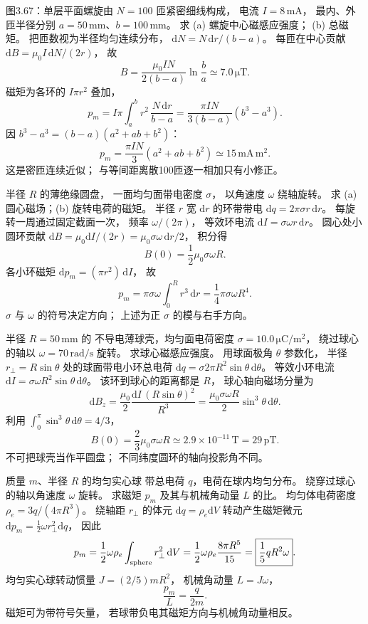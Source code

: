 图3.67：单层平面螺旋由
$N=100$ 匝紧密细线构成，
电流 $I=8\,\mathrm{mA}$，
最内、外匝半径分别
$a=50\,\mathrm{mm}$、$b=100\,\mathrm{mm}$。
求 (a) 螺旋中心磁感应强度；
(b) 总磁矩。
\exsolution
把匝数视为半径均匀连续分布，
$\mathrm dN=N\,\mathrm dr/(b-a)$。
每匝在中心贡献
$\mathrm dB=\mu_0I\,\mathrm dN/(2r)$，
故
\[
\boxed{B=
\frac{\mu_0IN}{2(b-a)}\ln\frac ba
\simeq7.0\,\mathrm{\mu T}}.
\]
磁矩为各环的
$I\pi r^2$ 叠加，
\[
p_m=I\pi\int_a^b r^2\,
\frac{N\,\mathrm dr}{b-a}
=\frac{\pi IN}{3(b-a)}(b^3-a^3).
\]
因 $b^3-a^3=(b-a)(a^2+ab+b^2)$：
\[
\boxed{p_m=
\frac{\pi IN}{3}(a^2+ab+b^2)
\simeq15\,\mathrm{mA\,m^2}}.
\]
\excheck 这是密匝连续近似；
与等间距离散100匝逐一相加只有小修正。

半径 $R$ 的薄绝缘圆盘，
一面均匀面带电密度 $\sigma$，
以角速度 $\omega$ 绕轴旋转。
求 (a) 圆心磁场；(b) 旋转电荷的磁矩。
\exsolution
半径 $r$ 宽 $\mathrm dr$
的环带带电
$\mathrm dq=2\pi\sigma r\,\mathrm dr$。
每旋转一周通过固定截面一次，
频率 $\omega/(2\pi)$，
等效环电流
$\mathrm dI=\sigma\omega r\,\mathrm dr$。
圆心处小圆环贡献
$\mathrm dB=\mu_0\mathrm dI/(2r)
=\mu_0\sigma\omega\,\mathrm dr/2$，
积分得
\[
\boxed{B(0)=\frac12\mu_0\sigma\omega R}.
\]
各小环磁矩
$\mathrm dp_m=(\pi r^2)\,\mathrm dI$，
故
\[
\boxed{p_m=\pi\sigma\omega\int_0^Rr^3\,\mathrm dr
=\frac14\pi\sigma\omega R^4}.
\]
\excheck $\sigma$ 与 $\omega$
的符号决定方向；
上述为正 $\sigma$ 的模与右手方向。

半径 $R=50\,\mathrm{mm}$ 的
不导电薄球壳，均匀面电荷密度
$\sigma=10.0\,\mathrm{\mu C/m^2}$，
绕过球心的轴以
$\omega=70\,\mathrm{rad/s}$ 旋转。
求球心磁感应强度。
\exsolution
用球面极角 $\theta$ 参数化，
半径 $r_\perp=R\sin\theta$
处的球面带电小环总电荷
$\mathrm dq=\sigma2\pi R^2\sin\theta\,\mathrm d\theta$。
等效小环电流
$\mathrm dI=\sigma\omega R^2\sin\theta\,\mathrm d\theta$。
该环到球心的距离都是 $R$，
球心轴向磁场分量为
\[
\mathrm dB_z=
\frac{\mu_0}{2}\frac{\mathrm dI\,(R\sin\theta)^2}
{R^3}
=\frac{\mu_0\sigma\omega R}{2}
\sin^3\theta\,\mathrm d\theta.
\]
利用
$\int_0^\pi\sin^3\theta\,\mathrm d\theta=4/3$，
\[
\boxed{B(0)=\frac23\mu_0\sigma\omega R
\simeq2.9\times10^{-11}\,\mathrm T=29\,\mathrm{pT}}.
\]
\excheck 不可把球壳当作平圆盘；
不同纬度圆环的轴向投影角不同。

质量 $m$、半径 $R$ 的均匀实心球
带总电荷 $q$，电荷在球内均匀分布。
绕穿过球心的轴以角速度 $\omega$ 旋转。
求磁矩 $p_m$ 及其与机械角动量 $L$ 的比。
\exsolution
均匀体电荷密度
$\rho_e=3q/(4\pi R^3)$。
绕轴距 $r_\perp$ 的体元
$\mathrm dq=\rho_e\mathrm dV$
转动产生磁矩微元
$\mathrm dp_m=\frac12\omega r_\perp^2\mathrm dq$，
因此
\[
p_m=\frac12\omega\rho_e
\int_{\rm sphere}r_\perp^2\,\mathrm dV
=\frac12\omega\rho_e\frac{8\pi R^5}{15}
=\boxed{\frac15 qR^2\omega}.
\]
均匀实心球转动惯量
$J=(2/5)mR^2$，
机械角动量 $L=J\omega$，
\[
\boxed{\frac{p_m}{L}=\frac{q}{2m}}.
\]
\excheck 磁矩可为带符号矢量，
若球带负电其磁矩方向与机械角动量相反。

